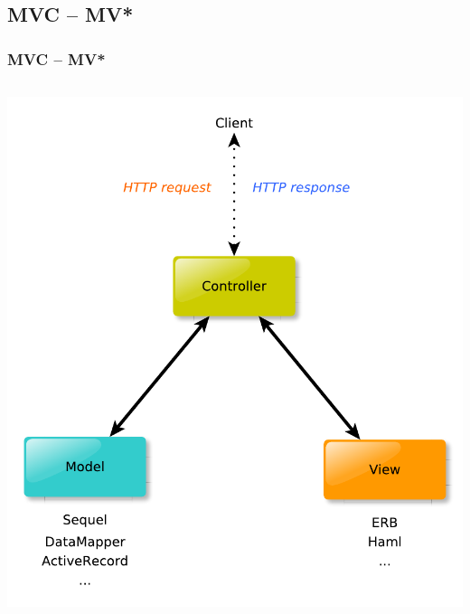 \documentclass{beamer}
\begin{document}
\subsection{MVC -- MV*} 
\begin{frame}[fragile]\frametitle{MVC -- MV*} 

  \begin{columns}[c] 

    \begin{column}{6cm}
      \includegraphics[scale=0.40]{diagrams/mvc.pdf}  
    \end{column}


\end{columns}
\end{frame}
\end{document}
